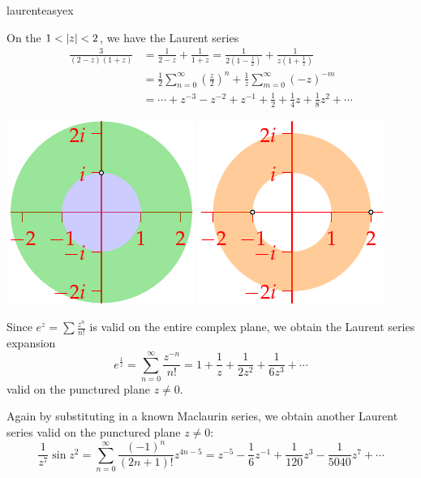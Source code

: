 \begin{examples}{}{laurenteasyex}
\begin{enumerate}
\begin{minipage}[t]{0.73\linewidth}
			\item On the \textcolor{orange}{$1<\left| z\right|<2$}, we have the Laurent series
			\begin{align*}
				\frac 3{(2-z)(1+z)}
				&=\frac 1{2-z}+\frac 1{1+z}=\frac 1{2(1-\frac z2)}+\frac 1{z(1+\frac 1z)} \\
				&=\frac 12\sum_{n=0}^\infty\left(\frac z2\right)^n+\frac 1z\sum_{m=0}^\infty(-z)^{-m}\\
				&=\cdots +z^{-3}-z^{-2}+z^{-1}+\frac 12+\frac 14z+\frac 18z^2+\cdots
			\end{align*}
		\end{minipage}
		\hfill
		\begin{minipage}[t]{0.26\linewidth}\vspace{-20pt}
			\flushright\includegraphics[scale=0.95]{laurent5}\bigbreak
			\includegraphics[scale=0.95]{laurent6}
		\end{minipage}\par	
		
	  \item Since $e^z=\sum \frac{z^n}{n!}$ is valid on the entire complex plane, we obtain the Laurent series expansion
	  \[
	  	e^{\frac 1z}=\sum_{n=0}^\infty\frac{z^{-n}}{n!}=1+\frac 1z+\frac 1{2z^2}+\frac 1{6z^3}+\cdots
	  \]
	  valid on the punctured plane $z\neq 0$.
	  
	  \item Again by substituting in a known Maclaurin series, we obtain another Laurent series valid on the punctured plane $z\neq 0$:
	  \[
	  	\frac 1{z^7}\sin z^2
	  	=\sum_{n=0}^\infty\frac{(-1)^n}{(2n+1)!}z^{4n-5} 
	  	=z^{-5}-\frac 16z^{-1}+\frac 1{120}z^3-\frac 1{5040}z^7+\cdots
	  \]
	  

\end{enumerate}
\end{examples}
